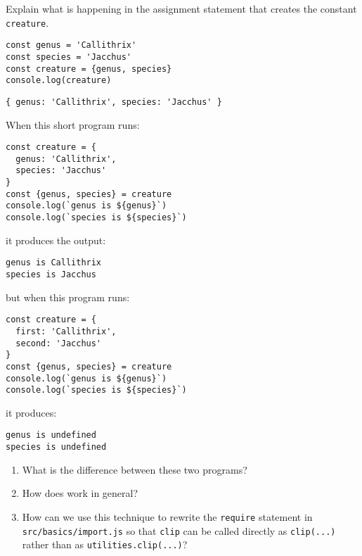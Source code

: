
Explain what is happening in the assignment statement that creates the constant \texttt{creature}.

\begin{verbatim}
const genus = 'Callithrix'
const species = 'Jacchus'
const creature = {genus, species}
console.log(creature)
\end{verbatim}

\begin{verbatim}
{ genus: 'Callithrix', species: 'Jacchus' }
\end{verbatim}


When this short program runs:

\begin{verbatim}
const creature = {
  genus: 'Callithrix',
  species: 'Jacchus'
}
const {genus, species} = creature
console.log(`genus is ${genus}`)
console.log(`species is ${species}`)
\end{verbatim}

\noindent
it produces the output:

\begin{verbatim}
genus is Callithrix
species is Jacchus
\end{verbatim}

\noindent
but when this program runs:

\begin{verbatim}
const creature = {
  first: 'Callithrix',
  second: 'Jacchus'
}
const {genus, species} = creature
console.log(`genus is ${genus}`)
console.log(`species is ${species}`)
\end{verbatim}

\noindent
it produces:

\begin{verbatim}
genus is undefined
species is undefined
\end{verbatim}

\begin{enumerate}
\item
  What is the difference between these two programs?
\item
  How does  work in general?
\item
  How can we use this technique to rewrite the \texttt{require} statement in \texttt{src/basics/import.js}
  so that \texttt{clip} can be called directly as \texttt{clip(...)} rather than as \texttt{utilities.clip(...)}?
\end{enumerate}

